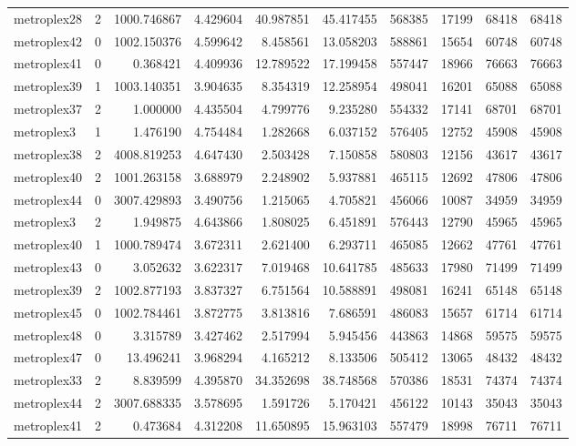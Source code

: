 \begin{longtable}{|l|r|r|r|r|r|r|r|r|r|}
metroplex28 & 2 & 1000.746867 & 4.429604 & 40.987851 & 45.417455 & 568385 & 17199 & 68418 & 68418 \\
metroplex42 & 0 & 1002.150376 & 4.599642 & 8.458561 & 13.058203 & 588861 & 15654 & 60748 & 60748 \\
metroplex41 & 0 & 0.368421 & 4.409936 & 12.789522 & 17.199458 & 557447 & 18966 & 76663 & 76663 \\
metroplex39 & 1 & 1003.140351 & 3.904635 & 8.354319 & 12.258954 & 498041 & 16201 & 65088 & 65088 \\
metroplex37 & 2 & 1.000000 & 4.435504 & 4.799776 & 9.235280 & 554332 & 17141 & 68701 & 68701 \\
metroplex3 & 1 & 1.476190 & 4.754484 & 1.282668 & 6.037152 & 576405 & 12752 & 45908 & 45908 \\
metroplex38 & 2 & 4008.819253 & 4.647430 & 2.503428 & 7.150858 & 580803 & 12156 & 43617 & 43617 \\
metroplex40 & 2 & 1001.263158 & 3.688979 & 2.248902 & 5.937881 & 465115 & 12692 & 47806 & 47806 \\
metroplex44 & 0 & 3007.429893 & 3.490756 & 1.215065 & 4.705821 & 456066 & 10087 & 34959 & 34959 \\
metroplex3 & 2 & 1.949875 & 4.643866 & 1.808025 & 6.451891 & 576443 & 12790 & 45965 & 45965 \\
metroplex40 & 1 & 1000.789474 & 3.672311 & 2.621400 & 6.293711 & 465085 & 12662 & 47761 & 47761 \\
metroplex43 & 0 & 3.052632 & 3.622317 & 7.019468 & 10.641785 & 485633 & 17980 & 71499 & 71499 \\
metroplex39 & 2 & 1002.877193 & 3.837327 & 6.751564 & 10.588891 & 498081 & 16241 & 65148 & 65148 \\
metroplex45 & 0 & 1002.784461 & 3.872775 & 3.813816 & 7.686591 & 486083 & 15657 & 61714 & 61714 \\
metroplex48 & 0 & 3.315789 & 3.427462 & 2.517994 & 5.945456 & 443863 & 14868 & 59575 & 59575 \\
metroplex47 & 0 & 13.496241 & 3.968294 & 4.165212 & 8.133506 & 505412 & 13065 & 48432 & 48432 \\
metroplex33 & 2 & 8.839599 & 4.395870 & 34.352698 & 38.748568 & 570386 & 18531 & 74374 & 74374 \\
metroplex44 & 2 & 3007.688335 & 3.578695 & 1.591726 & 5.170421 & 456122 & 10143 & 35043 & 35043 \\
metroplex41 & 2 & 0.473684 & 4.312208 & 11.650895 & 15.963103 & 557479 & 18998 & 76711 & 76711 \\

\end{longtable}
